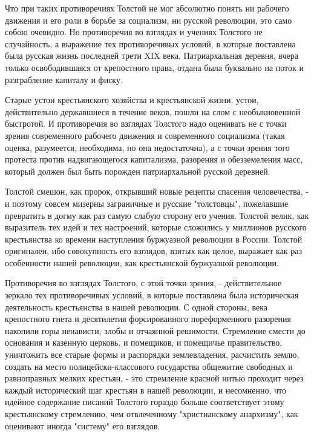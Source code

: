 \documentclass[12pt]{article}
\newcommand{\parnum}{(\arabic{parcount})}
\newcounter{parcount}
\newenvironment{parnumbers}{%
  \par%
  \everypar{\noindent \stepcounter{parcount}\marginpar[]{\parnum}}%
}{}
\begin{document}
\begin{parnumbers}
Что при таких противоречиях Толстой не мог абсолютно понять ни рабочего движения и его роли в борьбе за социализм, ни русской революции, это само собою очевидно. Но противоречия во взглядах и учениях Толстого не случайность, а выражение тех противоречивых условий, в которые поставлена была русская жизнь последней трети XIX века. Патриархальная деревня, вчера только освободившаяся от крепостного права, отдана была буквально на поток и разграбление капиталу и фиску.

Старые устои крестьянского хозяйства и крестьянской жизни, устои, действительно державшиеся в течение веков, пошли на слом с необыкновенной быстротой. И противоречия во взглядах Толстого надо оценивать не с точки зрения современного рабочего движения и современного социализма (такая оценка, разумеется, необходима, но она недостаточна), а с точки зрения того протеста против надвигающегося капитализма, разорения и обезземеления масс, который должен был быть порожден патриархальной русской деревней.

Толстой смешон, как пророк, открывший новые рецепты спасения человечества, - и поэтому совсем мизерны заграничные и русские "толстовцы", пожелавшие превратить в догму как раз самую слабую сторону его учения. Толстой велик, как выразитель тех идей и тех настроений, которые сложились у миллионов русского крестьянства ко времени наступления буржуазной революции в России. Толстой оригинален, ибо совокупность его взглядов, взятых как целое, выражает как раз особенности нашей революции, как крестьянской буржуазной революции.

Противоречия во взглядах Толстого, с этой точки зрения, - действительное зеркало тех противоречивых условий, в которые поставлена была историческая деятельность крестьянства в нашей революции. С одной стороны, века крепостного гнета и десятилетия форсированного пореформенного разорения накопили горы ненависти, злобы и отчаянной решимости. Стремление смести до основания и казенную церковь, и помещиков, и помещичье правительство, уничтожить все старые формы и распорядки землевладения, расчистить землю, создать на место полицейски-классового государства общежитие свободных и равноправных мелких крестьян, - это стремление красной нитью проходит через каждый исторический шаг крестьян в нашей революции, и несомненно, что идейное содержание писаний Толстого гораздо больше соответствует этому крестьянскому стремлению, чем отвлеченному "христианскому анархизму", как оценивают иногда "систему" его взглядов.


\end{parnumbers}
\end{document}
